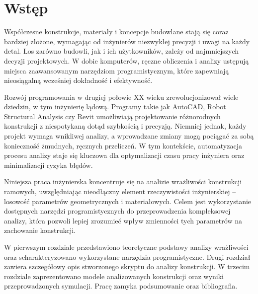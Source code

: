 \newpage
\section{Wstęp}

Współczesne konstrukcje, materiały i koncepcje budowlane stają się coraz bardziej złożone, wymagając od inżynierów niezwykłej precyzji i uwagi na każdy detal.
Los zarówno budowli, jak i ich użytkowników, zależy od najmniejszych decyzji projektowych.
W dobie komputerów, ręczne obliczenia i analizy ustępują miejsca zaawansowanym narzędziom programistycznym, które zapewniają nieosiągalną wcześniej dokładność i efektywność.

Rozwój programowania w drugiej połowie XX wieku zrewolucjonizował wiele dziedzin, w tym inżynierię lądową.
Programy takie jak AutoCAD, Robot Structural Analysis czy Revit umożliwiają projektowanie różnorodnych konstrukcji z niespotykaną dotąd szybkością i precyzją.
Niemniej jednak, każdy projekt wymaga wnikliwej analizy, a wprowadzane zmiany mogą pociągać za sobą konieczność żmudnych, ręcznych przeliczeń.
W tym kontekście, automatyzacja procesu analizy staje się kluczowa dla optymalizacji czasu pracy inżyniera oraz minimalizacji ryzyka błędów.

Niniejsza praca inżynierska koncentruje się na analizie wrażliwości konstrukcji ramowych, uwzględniając nieodłączny element rzeczywistości inżynierskiej – losowość parametrów geometrycznych i materiałowych.
Celem jest wykorzystanie dostępnych narzędzi programistycznych do przeprowadzenia kompleksowej analizy, która pozwoli lepiej zrozumieć wpływ zmienności tych parametrów na zachowanie konstrukcji.

W pierwszym rozdziale przedstawiono teoretyczne podstawy analizy wrażliwości oraz scharakteryzowano wykorzystane narzędzia programistyczne.
Drugi rozdział zawiera szczegółowy opis stworzonego skryptu do analizy konstrukcji.
W trzecim rozdziale zaprezentowano modele analizowanych konstrukcji oraz wyniki przeprowadzonych symulacji.
Pracę zamyka podsumowanie oraz bibliografia.
